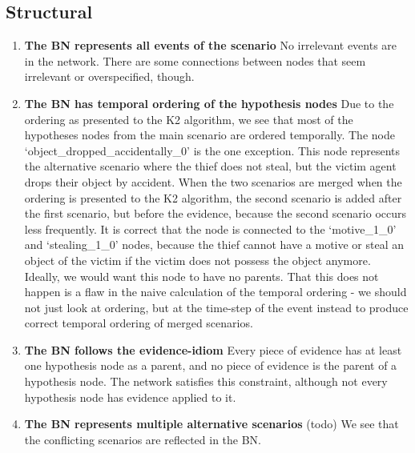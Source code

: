 \subsection{Structural}

\begin{enumerate}
\item \textbf{The BN represents all events of the scenario}
No irrelevant events are in the network. There are some connections between nodes that seem irrelevant or overspecified, though.

\item \textbf{The BN has temporal ordering of the hypothesis nodes}
Due to the ordering as presented to the K2 algorithm, we see that most of the hypotheses nodes from the main scenario are ordered temporally. The node `object\_dropped\_accidentally\_0' is the one exception. This node represents the alternative scenario where the thief does not steal, but the victim agent drops their object by accident. When the two scenarios are merged when the ordering is presented to the K2 algorithm, the second scenario is added after the first scenario, but before the evidence, because the second scenario occurs less frequently. It is correct that the node is connected to the `motive\_1\_0'  and `stealing\_1\_0' nodes, because the thief cannot have a motive or steal an object of the victim if the victim does not possess the object anymore. Ideally, we would want this node to have no parents. That this does not happen is a flaw in the naive calculation of the temporal ordering - we should not just look at ordering, but at the time-step of the event instead to produce correct temporal ordering of merged scenarios.


\item \textbf{The BN follows the evidence-idiom}
Every piece of evidence has at least one hypothesis node as a parent, and no piece of evidence is the parent of a hypothesis node. The network satisfies this constraint, although not every hypothesis node has evidence applied to it.

\item \textbf{The BN represents multiple alternative scenarios}
(todo) We see that the conflicting scenarios are reflected in the BN.

\end{enumerate}

